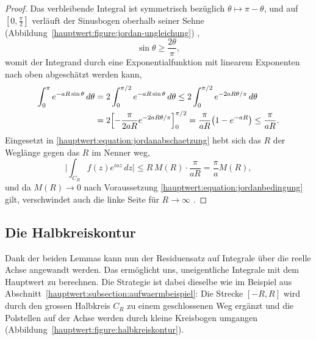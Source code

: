 \begin{proof}
  Das verbleibende Integral ist symmetrisch bezüglich
  $\theta \mapsto \pi - \theta$, und auf $[0,\frac{\pi}{2}]$ verläuft der
  Sinusbogen oberhalb seiner Sehne
  (Abbildung~\ref{hauptwert:figure:jordan-ungleichung})
  \cite[Abschnitt~81]{hauptwert:brown-churchill},
  \begin{equation}
    \sin\theta \ge \frac{2\theta}{\pi},
    \label{hauptwert:equation:jordanungleichung}
  \end{equation}
  womit der Integrand durch eine Exponentialfunktion mit linearem Exponenten
  nach oben abgeschätzt werden kann,
  \begin{equation}
  \begin{aligned}
    \int_{0}^{\pi} e^{-aR\sin\theta}\,d\theta
    &= 2 \int_{0}^{\pi/2} e^{-aR\sin\theta}\,d\theta
     \le 2 \int_{0}^{\pi/2} e^{-2aR\theta/\pi}\,d\theta \\
    &= 2 \Bigl[
         -\frac{\pi}{2aR} e^{-2aR\theta/\pi}
       \Bigr]_{0}^{\pi/2}
     = \frac{\pi}{aR}\bigl(1 - e^{-aR}\bigr)
     \le \frac{\pi}{aR}.
  \end{aligned}
  \end{equation}
  Eingesetzt in \eqref{hauptwert:equation:jordanabschaetzung} hebt sich das
  $R$ der Weglänge gegen das $R$ im Nenner weg,
  \begin{equation}
    \biggl| \int_{C_R} f(z) e^{iaz}\,dz \biggr|
    \le
    R\,M(R) \cdot \frac{\pi}{aR}
    =
    \frac{\pi}{a} M(R),
  \end{equation}
  und da $M(R) \to 0$ nach Voraussetzung
  \eqref{hauptwert:equation:jordanbedingung} gilt, verschwindet auch die
  linke Seite für $R \to \infty$
  \cite{hauptwert:qncubed3-jordan}.
\end{proof}


\subsection{Die Halbkreiskontur
\label{hauptwert:subsection:halbkreiskontur}}

Dank der beiden Lemmas kann nun der Residuensatz auf Integrale über die
reelle Achse angewandt werden.
Das ermöglicht uns, uneigentliche Integrale mit dem Hauptwert zu berechnen.
Die Strategie ist dabei dieselbe wie im
Beispiel aus Abschnitt~\ref{hauptwert:subsection:aufwaermbeispiel}:
Die Strecke $[-R, R]$ wird durch den grossen Halbkreis
$C_R$ zu einem geschlossenen Weg ergänzt und die Polstellen auf der
Achse werden durch kleine Kreisbogen umgangen
(Abbildung~\ref{hauptwert:figure:halbkreiskontur}).


